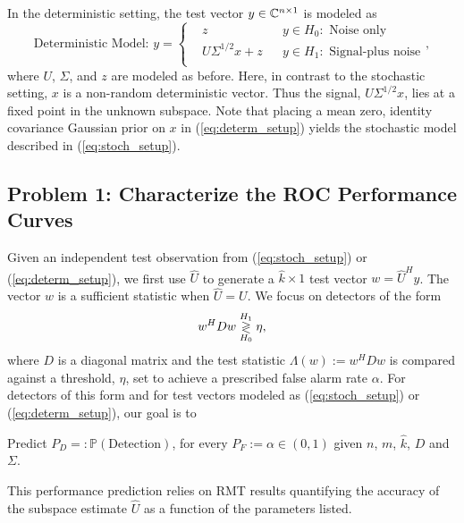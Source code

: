 In the deterministic setting, the test vector $y\in\mathbb{C}^{n\times 1}$ is modeled as
\begin{equation}\label{eq:determ_setup}
\text{Deterministic Model: }y=\left\{
\begin{aligned}
&z
&& y\in H_0:\text{ Noise only}\\
&U\Sigma^{1/2} x+z
&& y\in H_1:\text{ Signal-plus noise}\\
\end{aligned}\right. ,
\end{equation}
where $U$, $\Sigma$, and $z$ are modeled as before. Here, in contrast to the stochastic setting, $x$ is a non-random deterministic vector. Thus the signal, $U\Sigma^{1/2}x$, lies at a fixed point in the unknown subspace. Note that placing a mean zero, identity covariance Gaussian prior on $x$ in (\ref{eq:determ_setup}) yields the stochastic model described in (\ref{eq:stoch_setup}).

\subsection{Problem 1: Characterize the ROC Performance Curves}\label{sec:problem 1}
Given an independent test observation from (\ref{eq:stoch_setup}) or (\ref{eq:determ_setup}), we first use $\widehat{U}$ to generate a $\widehat{k}\times 1$ test vector $w=\widehat{U}^Hy$. The vector $w$ is a sufficient statistic \cite{scharf1991statistical} when $\widehat{U} = U$. We focus on detectors of the form
\begin{equation}\label{eq:detector_form}
w^HDw\detgtrless\eta,
\end{equation}
where $D$ is a diagonal matrix and the test statistic $\Lambda(w) := w^HDw$ is compared against a threshold, $\eta$, set to achieve a prescribed false alarm rate $\alpha$. For detectors of this form and for test vectors modeled as (\ref{eq:stoch_setup}) or (\ref{eq:determ_setup}), our goal is to
\begin{center}
Predict $P_D=:\mathbb{P}(\text{Detection})$, for every $P_F:=\alpha \in (0,1)$ given $n$, $m$, $\widehat{k}$, $D$ and $\Sigma$.
\end{center}

This performance prediction relies on RMT results quantifying the accuracy of the subspace estimate $\widehat{U}$ as a function of the parameters listed.

